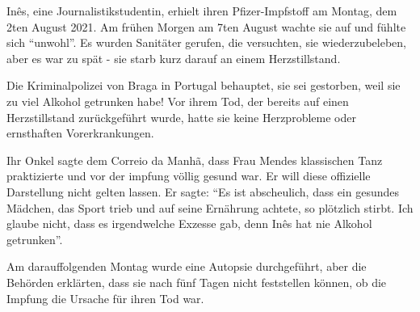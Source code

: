 Inês, eine Journalistikstudentin, erhielt ihren Pfizer-Impfstoff am Montag, dem
2ten August 2021. Am frühen Morgen am 7ten August wachte sie auf und fühlte sich
``unwohl''. Es wurden Sanitäter gerufen, die versuchten, sie wiederzubeleben,
aber es war zu spät - sie starb kurz darauf an einem Herzstillstand.

Die Kriminalpolizei von Braga in Portugal behauptet, sie sei gestorben, weil sie
zu viel Alkohol getrunken habe! Vor ihrem Tod, der bereits auf einen
Herzstillstand zurückgeführt wurde, hatte sie keine Herzprobleme oder
ernsthaften Vorerkrankungen.

Ihr Onkel sagte dem Correio da Manhã, dass Frau Mendes klassischen Tanz
praktizierte und vor der impfung völlig gesund war. Er will diese offizielle
Darstellung nicht gelten lassen. Er sagte: ``Es ist abscheulich, dass ein
gesundes Mädchen, das Sport trieb und auf seine Ernährung achtete, so plötzlich
stirbt. Ich glaube nicht, dass es irgendwelche Exzesse gab, denn Inês hat nie
Alkohol getrunken''.

Am darauffolgenden Montag wurde eine Autopsie durchgeführt, aber die Behörden
erklärten, dass sie nach fünf Tagen nicht feststellen können, ob die Impfung die
Ursache für ihren Tod war.
